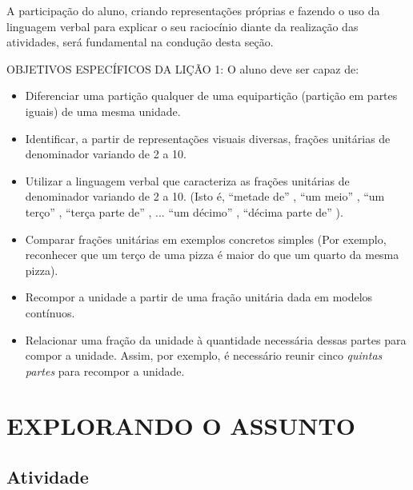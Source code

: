 \documentclass[a4paper,12pt,twoside]{book}
\begin{document}
\begin{professor*}[breakable]{}{}
  A participação do aluno, criando representações próprias e fazendo o uso da linguagem verbal para explicar o seu raciocínio diante da realização das atividades, será fundamental na condução desta seção.  
  
  OBJETIVOS ESPECÍFICOS DA LIÇÃO 1:  
  O aluno deve ser capaz de:  
\begin{itemize} %
    \item       Diferenciar uma partição qualquer de uma equipartição (partição em partes iguais) de uma mesma unidade.
    \item       Identificar, a partir de representações visuais diversas, frações unitárias de denominador variando de 2 a 10. 
    \item       Utilizar a linguagem verbal que caracteriza as frações unitárias de denominador variando de 2 a 10. (Isto é,       ``metade de''      ,       ``um meio''      ,       ``um terço''      ,       ``terça parte de''      , ...       ``um décimo''      ,       ``décima parte de''      ).
    \item       Comparar frações unitárias em exemplos concretos simples (Por exemplo, reconhecer que um terço de uma pizza é maior do que um quarto da mesma pizza).
    \item       Recompor a unidade a partir de uma fração unitária dada em modelos contínuos. 
    \item       Relacionar uma fração da unidade à quantidade necessária dessas partes para compor a unidade. Assim, por exemplo, é necessário reunir cinco       {\it quintas partes}       para recompor a unidade.  
\end{itemize} %
  
\end{professor*}







\section*{EXPLORANDO O ASSUNTO }



\subsection{Atividade}
\end{document}
